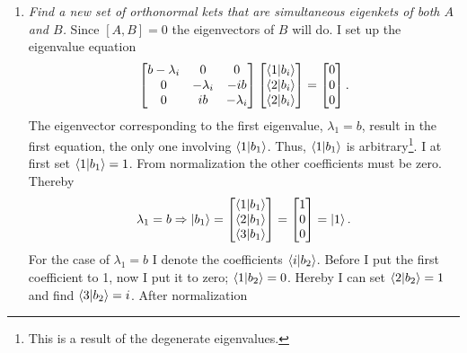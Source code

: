 \begin{example}
\begin{enumerate}
		\item \emph{Find a new set of orthonormal kets that are simultaneous eigenkets of both $A$ and $B$.}\newline
		Since $[A,B]=0$ the eigenvectors of $B$ will do. I set up the eigenvalue equation
		\begin{equation}
			\begin{bmatrix}
				b-\lambda_i & 0 & 0 \\
				0 & -\lambda_i & -ib\\
				0 & ib & -\lambda_i \\
			\end{bmatrix}
			\begin{bmatrix}
				\braket{1|b_i}\\
				\braket{2|b_i}\\
				\braket{2|b_i}\\
			\end{bmatrix}
			=\begin{bmatrix}
				0\\
				0\\
				0\\
			\end{bmatrix}.
		\end{equation} 
		The eigenvector corresponding to the first eigenvalue, $\lambda_1=b$, result in the first equation, the only one involving $\braket{1|b_1}$. Thus, $\braket{1|b_1}$ is arbitrary\footnote{This is a result of the degenerate eigenvalues.}. I at first set $\braket{1|b_1}=1$. From normalization the other coefficients must be zero. Thereby
		\begin{equation}
			\lambda_1=b\Rightarrow
			\ket{b_1}=\begin{bmatrix}
				\braket{1|b_1}\\
				\braket{2|b_1}\\
				\braket{3|b_1}\\
			\end{bmatrix}=\begin{bmatrix}
				1\\
				0\\
				0\\
			\end{bmatrix}=\ket{1}.
		\end{equation} 
		For the case of $\lambda_1=b$ I denote the coefficients $\braket{i|b_2}$. Before I put the first coefficient to 1, now I put it to zero; $\braket{1|b_2}=0$. Hereby I can set $\braket{2|b_2}=1$ and find $\braket{3|b_2}=i$. After normalization
		\begin{equation}

\end{equation}
\end{enumerate}
\end{example}
